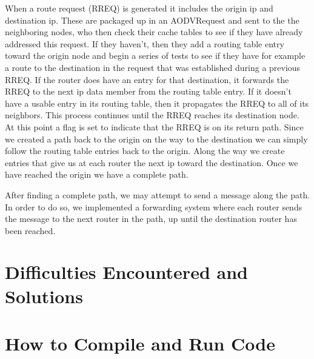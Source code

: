 \documentclass[12pt, titlepage]{article}
\begin{document}
When a route request (RREQ) is generated it includes the origin ip and destination ip.  These are packaged up in an AODVRequest and sent to the the neighboring nodes, who then check their cache tables to see if they have already addressed this request.  If they haven't, then they add a routing table entry toward the origin node and begin a series of tests to see if they have for example a route to the destination in the request that was established during a previous RREQ.  If the router does have an entry for that destination, it forwards the RREQ to the next ip data member from the routing table entry.  If it doesn't have a usable entry in its routing table, then it propagates the RREQ to all of its neighbors.  This process continues until the RREQ reaches its destination node.  At this point a flag is set to indicate that the RREQ is on its return path.  Since we created a path back to the origin on the way to the destination we can simply follow the routing table entries back to the origin.  Along the way we create entries that give us at each router the next ip toward the destination.  Once we have reached the origin we have a complete path.

After finding a complete path, we may attempt to send a message along the path. In order to do so, we implemented a forwarding system
where each router sends the message to the next router in the path, up until the destination router has been reached. 


\section{Difficulties Encountered and Solutions}



\section{How to Compile and Run Code}
\end{document}

